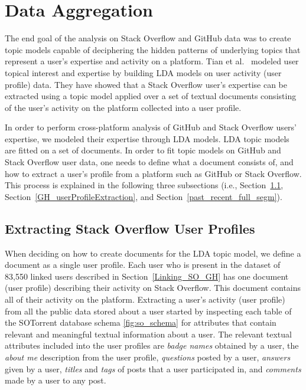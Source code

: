 \section{Data Aggregation} \label{sec:data_aggregation}

    The end goal of the analysis on Stack Overflow and GitHub data was to create topic models capable of deciphering the hidden patterns of underlying topics that represent a user's expertise and activity on a platform. Tian et al.~\cite{tian2013predicting} modeled user topical interest and expertise by building LDA models on user activity (user profile) data. They have showed that a Stack Overflow user's expertise can be extracted using a topic model applied over a set of textual documents consisting of the user's activity on the platform collected into a user profile.

    In order to perform cross-platform analysis of GitHub and Stack Overflow users' expertise, we modeled their expertise through LDA models. LDA topic models are fitted on a set of documents. In order to fit topic models on GitHub and Stack Overflow user data, one needs to define what a document consists of, and how to extract a user's profile from a platform such as GitHub or Stack Overflow. This process is explained in the following three subsections (i.e., Section~\ref{SO_userProfileExtraction}, Section~\ref{GH_userProfileExtraction}, and Section~\ref{past_recent_full_segm}).
    
    \subsection{Extracting Stack Overflow User Profiles} \label{SO_userProfileExtraction}
    
        When deciding on how to create documents for the LDA topic model, we define a document as a single user profile. Each user who is present in the dataset of 83,550 linked users described in Section~\ref{Linking_SO_GH} has one document (user profile) describing their activity on Stack Overflow. This document contains all of their activity on the platform. Extracting a user's activity (user profile) from all the public data stored about a user started by inspecting each table of the SOTorrent database schema \ref{fig:so_schema} for attributes that contain relevant and meaningful textual information about a user. The relevant textual attributes included into the user profiles are \textit{badge names} obtained by a user, the \textit{about me} description from the user profile, \textit{questions} posted by a user, \textit{answers} given by a user, \textit{titles} and \textit{tags} of posts that a user participated in, and \textit{comments} made by a user to any post. 
          
